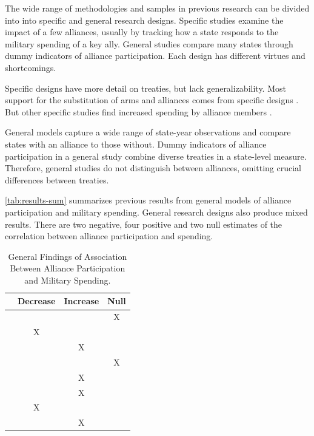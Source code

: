 \documentclass[12pt]{article}
\begin{document}
The wide range of methodologies and samples in previous research can be divided into into specific and general research designs.  
Specific studies examine the impact of a few alliances, usually by tracking how a state responds to the military spending of a key ally. 
General studies compare many states through dummy indicators of alliance participation. 
Each design has different virtues and shortcomings. 


Specific designs have more detail on treaties, but lack generalizability. 
Most support for the substitution of arms and alliances comes from specific designs \citep{BarnettLevy1991, Morrow1993, Sorokin1994, PluemperNeumayer2015}. 
But other specific studies find increased spending by alliance members \citep{ConybeareSandler1990, Chenetal1996}. 



General models capture a wide range of state-year observations and compare states with an alliance to those without.
Dummy indicators of alliance participation in a general study combine diverse treaties in a state-level measure. 
Therefore, general studies do not distinguish between alliances, omitting crucial differences between treaties.  


\autoref{tab:results-sum} summarizes previous results from general models of alliance participation and military spending. 
General research designs also produce mixed results. 
There are two negative, four positive and two null estimates of the correlation between alliance participation and spending. 


\begin{table}[hbt!]
\begin{center}
\begin{tabular}{lccc}
     & Decrease & Increase & Null \\
\hline
\citet{MostSiverson1987} &  &  & X \\
\citet{Conybeare1994} & X & &  \\
\citet{Diehl1994} &  & X &  \\
\citet{Goldsmith2003} &  &  & X \\
\citet{MorganPalmer2006} &  & X & \\ 
\citet{QuirozFlores2011} &  & X &  \\ 
\citet{DigiuseppePoast2016} & X &  & \\ 
\citet{Horowitzetal2017} &  & X & \\ 
\hline
\end{tabular}
\caption{General Findings of Association Between Alliance Participation and Military Spending.}
\label{tab:results-sum}
\end{center} 
\end{table}
\end{document}
